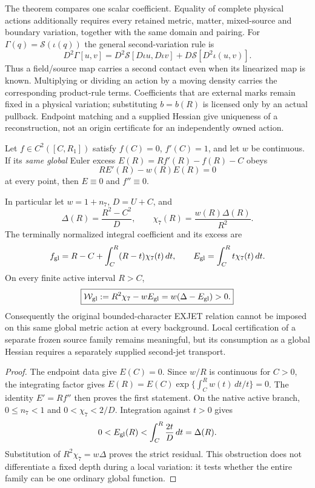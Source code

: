 \documentclass[12pt,a4paper]{article}
\begin{document}
\begin{remark}
The theorem compares one scalar coefficient. Equality of complete physical
actions additionally requires every retained metric, matter, mixed-source
and boundary variation, together with the same domain and pairing. For
$\Gamma(q)=\mathcal S(\iota(q))$ the general second-variation rule is
\[
 D^2\Gamma[u,v]=D^2\mathcal S[D\iota u,D\iota v]
                    +D\mathcal S[D^2\iota(u,v)].
\]
Thus a field/source map carries a second contact even when its linearized
map is known. Multiplying or dividing an action by a moving density carries
the corresponding product-rule terms. Coefficients that are external
marks remain fixed in a physical variation; substituting $b=b(R)$ is
licensed only by an actual pullback. Endpoint matching and a supplied
Hessian give uniqueness of a reconstruction, not an origin certificate for
an independently owned action.
\end{remark}

\begin{theorem}
\label{p3d:thm:v2216-exjet-global-obstruction}
Let $f\in C^2([C,R_1])$ satisfy $f(C)=0$, $f'(C)=1$, and let $w$ be
continuous. If its \emph{same global} Euler excess
$E(R)=Rf'(R)-f(R)-C$ obeys
\[
 RE'(R)-w(R)E(R)=0
\]
at every point, then $E\equiv0$ and $f''\equiv0$.

In particular let $w=1+n_7$, $D=U+C$, and
\[
 \Delta(R)=\frac{R^2-C^2}{D},\qquad
 \chi_7(R)=\frac{w(R)\Delta(R)}{R^2}.
\]
The terminally normalized integral coefficient and its excess are
\[
 f_{\rm gl}=R-C+\int_C^R(R-t)\chi_7(t)\,dt,\qquad
 E_{\rm gl}=\int_C^R t\chi_7(t)\,dt.
\]
On every finite active interval $R>C$,
\begin{equation}
 \boxed{\mathcal W_{\rm gl}:=R^2\chi_7-wE_{\rm gl}
     =w(\Delta-E_{\rm gl})>0.}
 \label{p3d:eq:v2216-global-exjet-residual}
\end{equation}
Consequently the original bounded-character EXJET relation cannot be imposed
on this same global metric action at every background. Local certification
of a separate frozen source family remains meaningful, but its consumption
as a global Hessian requires a separately supplied second-jet transport.
\end{theorem}
\begin{proof}
The endpoint data give $E(C)=0$. Since $w/R$ is continuous for $C>0$,
the integrating factor gives
$E(R)=E(C)\exp\{\int_C^R w(t)\,dt/t\}=0$. The identity
$E'=Rf''$ then proves the first statement. On the native active branch,
$0\le n_7<1$ and $0<\chi_7<2/D$. Integration against $t>0$ gives
\[
 0<E_{\rm gl}(R)<\int_C^R\frac{2t}{D}\,dt=\Delta(R).
\]
Substitution of $R^2\chi_7=w\Delta$ proves the strict residual. This
obstruction does not differentiate a fixed depth during a local variation:
it tests whether the entire family can be one ordinary global function.
\end{proof}
\end{document}
